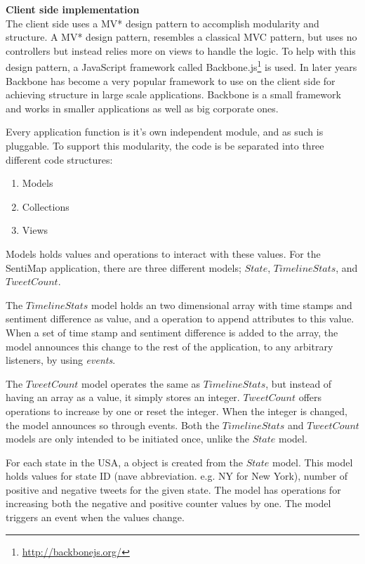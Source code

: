 \textbf{Client side implementation} \\

The client side uses a MV* design pattern to accomplish modularity and structure. A MV* design pattern, resembles a classical MVC pattern, but uses no controllers but instead relies more on views to handle the logic. To help with this design pattern, a JavaScript framework called Backbone.js\footnote{\url{http://backbonejs.org/}} is used. In later years Backbone has become a very popular framework to use on the client side for achieving structure in large scale applications. Backbone is a small framework and works in smaller applications as well as big corporate ones.

Every application function is it's own independent module, and as such is pluggable. To support this modularity, the code is be separated into three different code structures:

\begin{enumerate}
\item Models
\item Collections
\item Views
\end{enumerate}

Models holds values and operations to interact with these values. For the SentiMap application, there are three different models; $State$, $TimelineStats$, and $TweetCount$. 

The $TimelineStats$ model holds an two dimensional array with time stamps and sentiment difference as value, and a operation to append attributes to this value. When a set of time stamp and sentiment difference is added to the array, the model announces this change to the rest of the application, to any arbitrary listeners, by using \textit{events}. 

The $TweetCount$ model operates the same as $TimelineStats$, but instead of having an array as a value, it simply stores an integer. $TweetCount$ offers operations to increase by one or reset the integer. When the integer is changed, the model announces so through events. Both the $TimelineStats$ and $TweetCount$ models are only intended to be initiated once, unlike the $State$ model.

For each state in the USA, a object is created from the $State$ model. This model holds values for state ID (nave abbreviation. e.g. NY for New York), number of positive and negative tweets for the given state. The model has operations for increasing both the negative and positive counter values by one. The model triggers an event when the values change. 

